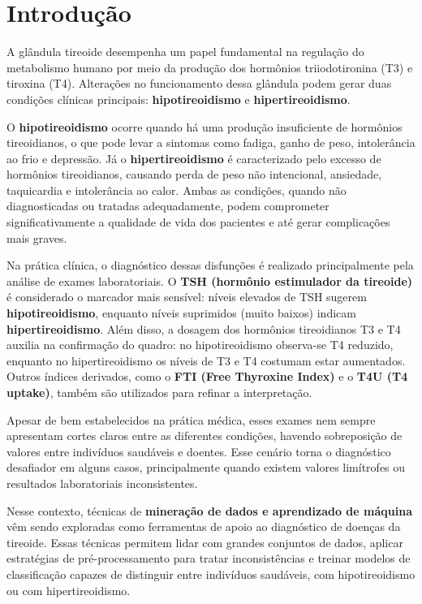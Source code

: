 \documentclass[11pt]{article}
\begin{document}
\section{Introdução}

A glândula tireoide desempenha um papel fundamental na regulação do metabolismo humano por meio da produção dos hormônios triiodotironina (T3) e tiroxina (T4). Alterações no funcionamento dessa glândula podem gerar duas condições clínicas principais: \textbf{hipotireoidismo} e \textbf{hipertireoidismo}.  

O \textbf{hipotireoidismo} ocorre quando há uma produção insuficiente de hormônios tireoidianos, o que pode levar a sintomas como fadiga, ganho de peso, intolerância ao frio e depressão. Já o \textbf{hipertireoidismo} é caracterizado pelo excesso de hormônios tireoidianos, causando perda de peso não intencional, ansiedade, taquicardia e intolerância ao calor. Ambas as condições, quando não diagnosticadas ou tratadas adequadamente, podem comprometer significativamente a qualidade de vida dos pacientes e até gerar complicações mais graves.  

Na prática clínica, o diagnóstico dessas disfunções é realizado principalmente pela análise de exames laboratoriais. O \textbf{TSH (hormônio estimulador da tireoide)} é considerado o marcador mais sensível: níveis elevados de TSH sugerem \textbf{hipotireoidismo}, enquanto níveis suprimidos (muito baixos) indicam \textbf{hipertireoidismo}. Além disso, a dosagem dos hormônios tireoidianos T3 e T4 auxilia na confirmação do quadro: no hipotireoidismo observa-se T4 reduzido, enquanto no hipertireoidismo os níveis de T3 e T4 costumam estar aumentados. Outros índices derivados, como o \textbf{FTI (Free Thyroxine Index)} e o \textbf{T4U (T4 uptake)}, também são utilizados para refinar a interpretação.  

Apesar de bem estabelecidos na prática médica, esses exames nem sempre apresentam cortes claros entre as diferentes condições, havendo sobreposição de valores entre indivíduos saudáveis e doentes. Esse cenário torna o diagnóstico desafiador em alguns casos, principalmente quando existem valores limítrofes ou resultados laboratoriais inconsistentes.  

Nesse contexto, técnicas de \textbf{mineração de dados e aprendizado de máquina} vêm sendo exploradas como ferramentas de apoio ao diagnóstico de doenças da tireoide. Essas técnicas permitem lidar com grandes conjuntos de dados, aplicar estratégias de pré-processamento para tratar inconsistências e treinar modelos de classificação capazes de distinguir entre indivíduos saudáveis, com hipotireoidismo ou com hipertireoidismo.  
\end{document}
